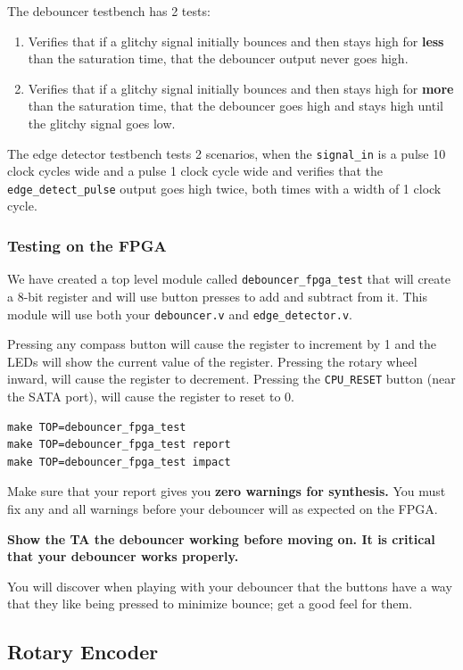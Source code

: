 \documentclass[11pt]{article}
\begin{document}
The debouncer testbench has 2 tests:
\begin{enumerate}
	\item Verifies that if a glitchy signal initially bounces and then stays high for \textbf{less} than the saturation time, that the debouncer output never goes high.
	\item Verifies that if a glitchy signal initially bounces and then stays high for \textbf{more} than the saturation time, that the debouncer goes high and stays high until the glitchy signal goes low.
\end{enumerate}

The edge detector testbench tests 2 scenarios, when the \verb|signal_in| is a pulse 10 clock cycles wide and a pulse 1 clock cycle wide and verifies that the \verb|edge_detect_pulse| output goes high twice, both times with a width of 1 clock cycle.

\subsubsection{Testing on the FPGA}
We have created a top level module called \verb|debouncer_fpga_test| that will create a 8-bit register and will use button presses to add and subtract from it. This module will use both your \verb|debouncer.v| and \verb|edge_detector.v|.

Pressing any compass button will cause the register to increment by 1 and the LEDs will show the current value of the register. Pressing the rotary wheel inward, will cause the register to decrement. Pressing the \verb|CPU_RESET| button (near the SATA port), will cause the register to reset to 0.

\begin{verbatim}
make TOP=debouncer_fpga_test
make TOP=debouncer_fpga_test report
make TOP=debouncer_fpga_test impact
\end{verbatim} 

Make sure that your report gives you \textbf{zero warnings for synthesis.} You must fix any and all warnings before your debouncer will as expected on the FPGA.

\textbf{Show the TA the debouncer working before moving on. It is critical that your debouncer works properly.}

You will discover when playing with your debouncer that the buttons have a way that they like being pressed to minimize bounce; get a good feel for them.

\subsection{Rotary Encoder}
\end{document}
